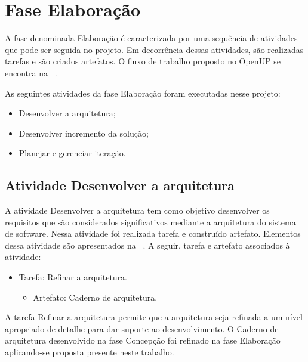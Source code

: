 \section{Fase Elaboração}

A fase denominada Elaboração é caracterizada por uma sequência de atividades que pode ser seguida no projeto. Em decorrência dessas atividades, são realizadas tarefas e são criados artefatos. O fluxo de trabalho proposto no OpenUP se encontra na ~.


%

As seguintes atividades da fase Elaboração foram executadas nesse projeto:

\begin{itemize}
    \item Desenvolver a arquitetura;
    \item Desenvolver incremento da solução;
    \item Planejar e gerenciar iteração.
\end{itemize}

\subsection{Atividade Desenvolver a arquitetura}

A atividade Desenvolver a arquitetura tem como objetivo desenvolver os requisitos que são considerados significativos mediante a arquitetura do sistema de software. Nessa atividade foi realizada tarefa e construído artefato. Elementos dessa atividade são apresentados na ~. A seguir, tarefa e artefato associados à atividade:

\begin{itemize}
    \item Tarefa: Refinar a arquitetura.
    \begin{itemize}
        \item Artefato: Caderno de arquitetura.
    \end{itemize}
\end{itemize}

%

A tarefa Refinar a arquitetura permite que a arquitetura seja refinada a um nível apropriado de detalhe para dar suporte ao desenvolvimento. O Caderno de arquitetura desenvolvido na fase Concepção foi refinado na fase Elaboração aplicando-se proposta presente neste trabalho.

